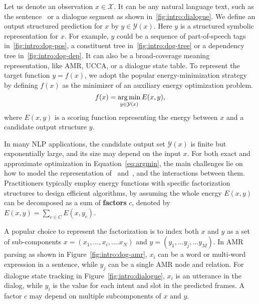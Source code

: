 Let us denote an observation $x \in \mathcal{X}$. It can be any natural
language text, such as the sentence~ or a dialogue segment as shown
in~\autoref{fig:intro:dialogue}. We define an output structured
prediction for $x$ by $y \in \mathcal{Y}(x)$. Here $y$ is a structured
symbolic representation for $x$. For example, $y$ could be a sequence
of part-of-speech tags in~\autoref{fig:intro:dog-pos}, a constituent
tree in~\autoref{fig:intro:dog-tree} or a dependency tree
in~\autoref{fig:intro:dog-dep}. It can also be a broad-coverage
meaning representation, like AMR, UCCA, or a dialogue state table. To
represent the target function $y=f(x)$, we adopt the popular
energy-minimization strategy by defining $f(x)$ as the minimizer of an
auxiliary energy optimization problem.
\begin{equation}
\label{eq:argmin}
f(x) = \operatorname*{arg\,min}_{y \in \mathcal{Y}(x)} E(x, y),
\end{equation}
where $E(x,y)$ is a scoring function representing the energy between
$x$ and a candidate output structure $y$.

In many NLP applications, the candidate output set $\mathcal{Y}(x)$ is
finite but exponentially large, and its size may depend on the input
$x$. For both exact and approximate optimization in
Equation~\ref{eq:argmin}, the main challenges lie on how to model the
representation of \IN~and~\OUT, and the interactions between
them. Practitioners typically employ energy functions with specific
factorization structures to design efficient algorithms, by assuming
the whole energy $E(x, y)$ can be decomposed as a sum of
\textbf{factors} $c$, denoted by $E(x, y) =\sum_{c \in C} E(x, y_{c})$.

A popular choice to represent the factorization is to index both $x$
and $y$ as a set of sub-components $x=(x_{1},..., x_{i},.... x_{N})$
and $y=(y_{1},...y_{j},...y_{M})$. In AMR parsing as shown in
Figure~\ref{fig:intro:dog-amr}, $x_{i}$ can be a word or multi-word
expression in a sentence, while $y_{j}$ can be a single AMR node and
relation.  For dialogue state tracking in
Figure~\ref{fig:intro:dialogue}, $x_{i}$ is an utterance in the
dialog, while $y_{i}$ is the value for each intent and slot in the
predicted frames. A factor $c$ may depend on multiple subcomponents
of $x$ and $y$.

